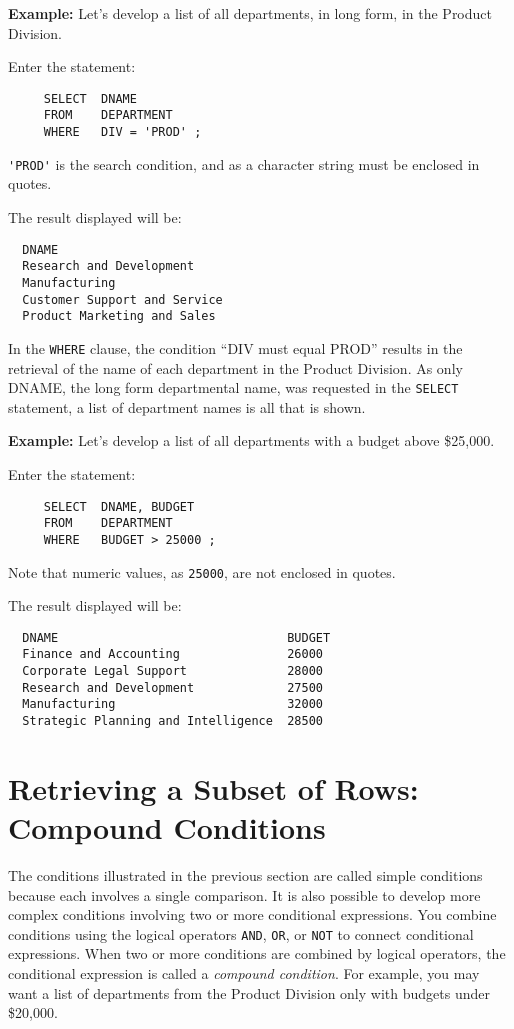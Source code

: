 {\bf Example:}
Let's develop a list of all departments, in long form, in the Product
Division.

Enter the statement:
\begin{verbatim}
     SELECT  DNAME
     FROM    DEPARTMENT
     WHERE   DIV = 'PROD' ;
\end{verbatim}
\verb`'PROD'` is the search condition, and as a character string must
be enclosed in quotes.

The result displayed will be:

\begin{screen}
\begin{verbatim}
  DNAME
  Research and Development
  Manufacturing
  Customer Support and Service
  Product Marketing and Sales
\end{verbatim}
\end{screen}

In the \verb`WHERE` clause, the condition ``DIV must equal PROD'' results in
the retrieval of the name of each department in the Product Division.
As only DNAME, the long form departmental name, was requested in the
\verb`SELECT` statement, a list of department names is all that is shown.

{\bf Example:}
Let's develop a list of all departments with a budget above \$25,000.

Enter the statement:
\begin{verbatim}
     SELECT  DNAME, BUDGET
     FROM    DEPARTMENT
     WHERE   BUDGET > 25000 ;
\end{verbatim}
Note that numeric values, as \verb`25000`, are not enclosed in
quotes.

The result displayed will be:

\begin{screen}
\begin{verbatim}
  DNAME                                BUDGET
  Finance and Accounting               26000
  Corporate Legal Support              28000
  Research and Development             27500
  Manufacturing                        32000
  Strategic Planning and Intelligence  28500
\end{verbatim}
\end{screen}

\section{Retrieving a Subset of Rows: Compound Conditions}

The conditions illustrated in the previous section are called simple
conditions because each involves a single comparison.  It is also
possible to develop more complex conditions involving two or more
conditional expressions.  You combine conditions using the logical
operators {\tt AND}, {\tt OR}, or {\tt NOT} to connect conditional expressions.  When
two or more conditions are combined by logical operators, the
conditional expression is called a {\em compound condition}.  For
example, you may want a list of departments from the Product Division
only with budgets under \$20,000.

